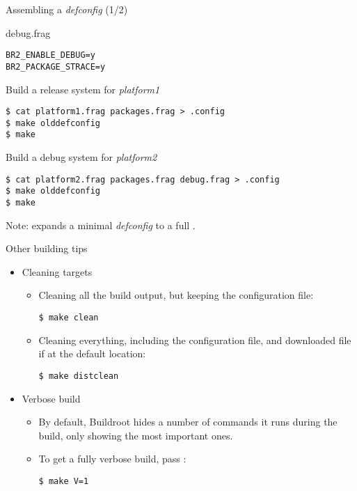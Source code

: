 \begin{frame}[fragile]{Assembling a {\em defconfig} (1/2)}

  \begin{block}{debug.frag}
    {\small
\begin{verbatim}
BR2_ENABLE_DEBUG=y
BR2_PACKAGE_STRACE=y
\end{verbatim}
    }
  \end{block}

  \begin{block}{Build a release system for {\em platform1}}
    {\small
\begin{verbatim}
$ cat platform1.frag packages.frag > .config
$ make olddefconfig
$ make
\end{verbatim}
    }
  \end{block}

  \begin{block}{Build a debug system for {\em platform2}}
    {\small
\begin{verbatim}
$ cat platform2.frag packages.frag debug.frag > .config
$ make olddefconfig
$ make
\end{verbatim}
    }
  \end{block}

  Note:  expands a minimal {\em defconfig} to a full
  .

\end{frame}

\begin{frame}[fragile]{Other building tips}
  \begin{itemize}
  \item Cleaning targets
    \begin{itemize}
    \item Cleaning all the build output, but keeping the configuration
      file:
      \begin{block}{}
\begin{verbatim}
$ make clean
\end{verbatim}
      \end{block}
    \item Cleaning everything, including the configuration file, and
      downloaded file if at the default location:
      \begin{block}{}
\begin{verbatim}
$ make distclean
\end{verbatim}
      \end{block}
    \end{itemize}
  \item Verbose build
    \begin{itemize}
    \item By default, Buildroot hides a number of commands it runs
      during the build, only showing the most important ones.
    \item To get a fully verbose build, pass :
      \begin{block}{}
\begin{verbatim}
$ make V=1
\end{verbatim}
      \end{block}
    \end{itemize}
  \end{itemize}
\end{frame}
